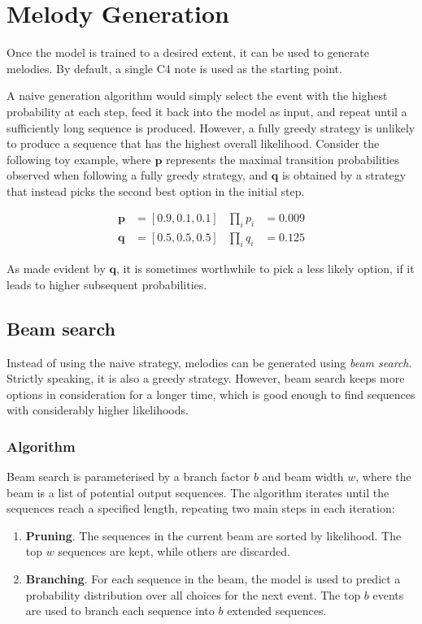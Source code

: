 \documentclass[../../report.tex]{subfiles}
\begin{document}
\section{Melody Generation}

Once the model is trained to a desired extent, it can be used to generate
melodies. By default, a single C4 note is used as the starting point.

A naive generation algorithm would simply select the event with the highest
probability at each step, feed it back into the model as input, and repeat until
a sufficiently long sequence is produced. However, a fully greedy strategy is
unlikely to produce a sequence that has the highest overall likelihood. Consider
the following toy example, where \(\bm{p}\) represents the maximal transition
probabilities observed when following a fully greedy strategy, and \(\bm{q}\) is
obtained by a strategy that instead picks the second best option in the initial
step.

\begin{align}
  \bm{p} &= [0.9, 0.1, 0.1] & \prod_{i} p_i &= 0.009
  \\
  \bm{q} &= [0.5, 0.5, 0.5] & \prod_{i} q_i &= 0.125
\end{align}

As made evident by \(\bm{q}\), it is sometimes worthwhile to pick a less likely
option, if it leads to higher subsequent probabilities.

\subsection{Beam search}

Instead of using the naive strategy, melodies can be generated using \emph{beam
search}. Strictly speaking, it is also a greedy strategy. However, beam search
keeps more options in consideration for a longer time, which is good enough to
find sequences with considerably higher likelihoods.

\subsubsection{Algorithm}

Beam search is parameterised by a branch factor \(b\) and beam width \(w\),
where the beam is a list of potential output sequences. The algorithm iterates
until the sequences reach a specified length, repeating two main steps in each
iteration:

\begin{enumerate}
  \item \textbf{Pruning}. The sequences in the current beam are sorted by
  likelihood. The top \(w\) sequences are kept, while others are discarded.

  \item \textbf{Branching}. For each sequence in the beam, the model is used to
  predict a probability distribution over all choices for the next event. The
  top \(b\) events are used to branch each sequence into \(b\) extended
  sequences.
\end{enumerate}
\end{document}

